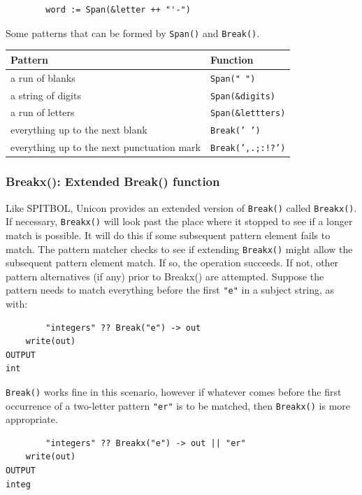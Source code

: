 \documentclass[letterpaper,12pt]{article}
\begin{document}
\begin{verbatim}
        word := Span(&letter ++ "'-")
\end{verbatim}

Some patterns that can be formed by {\tt Span()} and {\tt Break()}.
\begin{table}[h]
\begin{center}
{\begin{tabular}{ | l | l | } \hline 
        Pattern & Function \\ \hline
        a run of blanks & {\tt Span(" ")} \\ \hline
	a string of digits & {\tt Span(\&digits)} \\ \hline
	a run of letters & {\tt Span(\&lettters)} \\ \hline
	everything up to the next blank & {\tt Break(' ')} \\ \hline
	everything up to the next punctuation mark & {\tt Break(',.;:!?')} \\ \hline
\end{tabular}}
\end{center}
\end{table}

\subsubsection{Breakx(): Extended Break() function}

Like SPITBOL, Unicon provides an extended version of \texttt{Break()} called
\texttt{Breakx()}. If necessary, {\tt Breakx()} will look past the
place where it
stopped to see if a longer match is possible. It will do this if some
subsequent pattern element fails to match. The pattern matcher checks
to see if extending {\tt Breakx()} might allow the subsequent pattern
element match. If so, the operation succeeds. If not, other pattern
alternatives (if any) prior to Breakx() are attempted.  Suppose the
pattern needs to match everything before the first \texttt{"e"} in a
subject string, as with:

\begin{verbatim}
        "integers" ?? Break("e") -> out
	write(out)
OUTPUT
int
\end{verbatim}

{\tt Break()} works fine in this scenario, however if whatever comes before
the first occurrence of a two-letter pattern {\tt "er"} is to be matched,
then {\tt Breakx()} is more appropriate.

\begin{verbatim}
        "integers" ?? Breakx("e") -> out || "er"
	write(out)
OUTPUT
integ
\end{verbatim}
\end{document}
